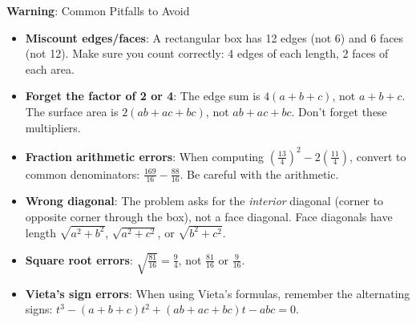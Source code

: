 \documentclass[12pt]{article}
\begin{document}
\begin{warningbox}
\textbf{Warning}: Common Pitfalls to Avoid

\begin{itemize}
    \item \textbf{Miscount edges/faces}: A rectangular box has 12 edges (not 6) and 6 faces (not 12). Make sure you count correctly: 4 edges of each length, 2 faces of each area.
    
    \item \textbf{Forget the factor of 2 or 4}: The edge sum is $4(a+b+c)$, not $a+b+c$. The surface area is $2(ab+ac+bc)$, not $ab+ac+bc$. Don't forget these multipliers.
    
    \item \textbf{Fraction arithmetic errors}: When computing $\left(\frac{13}{4}\right)^2 - 2\left(\frac{11}{4}\right)$, convert to common denominators: $\frac{169}{16} - \frac{88}{16}$. Be careful with the arithmetic.
    
    \item \textbf{Wrong diagonal}: The problem asks for the \emph{interior} diagonal (corner to opposite corner through the box), not a face diagonal. Face diagonals have length $\sqrt{a^2+b^2}$, $\sqrt{a^2+c^2}$, or $\sqrt{b^2+c^2}$.
    
    \item \textbf{Square root errors}: $\sqrt{\frac{81}{16}} = \frac{9}{4}$, not $\frac{81}{16}$ or $\frac{9}{16}$.
    
    \item \textbf{Vieta's sign errors}: When using Vieta's formulas, remember the alternating signs: $t^3 - (a+b+c)t^2 + (ab+ac+bc)t - abc = 0$.
\end{itemize}
\end{warningbox}
\end{document}
